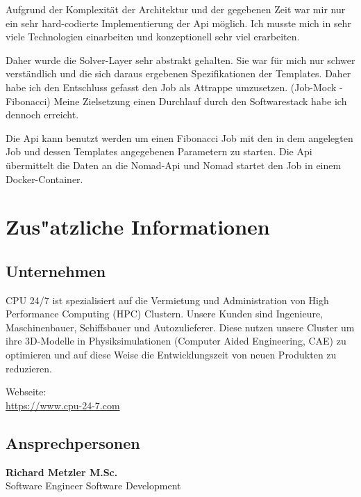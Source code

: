 \documentclass[12pt]{article}
\begin{document}
Aufgrund der Komplexität der Architektur und der gegebenen Zeit war mir nur ein sehr hard-codierte Implementierung der Api möglich. Ich musste mich in sehr viele Technologien einarbeiten und konzeptionell sehr viel erarbeiten.

Daher wurde die Solver-Layer sehr abstrakt gehalten. Sie war für mich nur schwer verständlich und die sich daraus ergebenen Spezifikationen der Templates. Daher habe ich den Entschluss gefasst den Job als Attrappe umzusetzen. (Job-Mock - Fibonacci) Meine Zielsetzung einen Durchlauf durch den Softwarestack habe ich dennoch erreicht.

Die Api kann benutzt werden um einen Fibonacci Job mit den in dem angelegten Job und dessen Templates angegebenen Parametern zu starten. Die Api übermittelt die Daten an die Nomad-Api und Nomad startet den Job in einem Docker-Container.





\newpage

\section{Zus"atzliche Informationen}
\subsection{Unternehmen}

CPU 24/7 ist spezialisiert auf die Vermietung und Administration
von High Performance Computing (HPC) Clustern.
Unsere Kunden sind Ingenieure, Maschinenbauer, Schiffsbauer und Autozulieferer.
Diese nutzen unsere Cluster um ihre 3D-Modelle in Physiksimulationen (Computer Aided Engineering, CAE)
zu optimieren und auf diese Weise die Entwicklungszeit von neuen Produkten zu reduzieren.

Webseite:\\
\url{https://www.cpu-24-7.com}



\subsection{Ansprechpersonen}

\textbf{Richard Metzler M.Sc.}\\
Software Engineer Software Development\\
\end{document}
